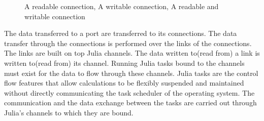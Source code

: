 \documentclass{juliacon}
\begin{document}
\begin{figure}
    \centering
     \hfil 
     \hfil 
    \caption{\protect{} A readable connection, \protect{} A writable connection, \protect{} A readable and writable connection}
    \label{fig: tasks}
\end{figure}

The data transferred to a port are transferred to its connections. The data transfer through the connections is performed over the links of the connections. The links are built on top Julia channels. The data written to(read from) a link is written to(read from) its channel. Running Julia tasks bound to the channels must exist for the data to flow through these channels. Julia tasks are the control flow features that allow calculations to be flexibly suspended and maintained without directly communicating the task scheduler of the operating system\cite{julialang}. The communication and the data exchange between the tasks are carried out through Julia's channels to which they are bound.
\end{document}
